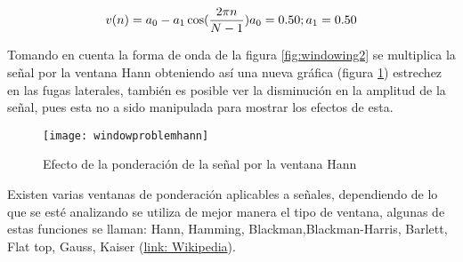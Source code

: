 				\begin{equation}										
					v(n) = a_{0} - a_{1} \cos (\frac{2\pi n}{N-1}) \\				
					a_{0}=0.50 ; a_{1}=0.50			
					\label{eq:hann}
				\end{equation}
			    
				Tomando en cuenta la forma de onda de la figura \ref{fig:windowing2} se multiplica la señal por la ventana Hann obteniendo así una nueva gráfica (figura \ref{fig:windowing3}) estrechez en las fugas laterales, también es posible ver la disminución en la amplitud de la señal, pues esta no a sido manipulada para mostrar los efectos de esta.
				\begin{figure}[H]
					\centering
					\texttt{[image: windowproblemhann]}
					\caption{Efecto de la ponderación de la señal por la ventana Hann}
					\label{fig:windowing3}	
				\end{figure}
		 		Existen varias ventanas de ponderación aplicables a señales, dependiendo de lo que se esté analizando se utiliza de mejor manera el tipo de ventana, algunas de estas funciones se llaman: Hann, Hamming, Blackman,Blackman-Harris, Barlett, Flat top, Gauss, Kaiser (\href{https://es.wikipedia.org/wiki/Ventana_(funcion)}{link: Wikipedia}).
